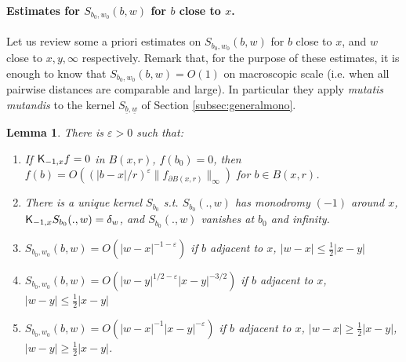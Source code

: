 \documentclass[10pt]{article}
\newcommand{\eps}{\varepsilon}
\newcommand{\rK}{{\sf K}}
\newtheorem{Lem}[thm]{Lemma}
\begin{document}
\paragraph{Estimates for $S_{b_0,w_0}(b,w)$ for $b$ close to $x$.\\}

Let us review some a priori estimates on $S_{b_0,w_0}(b,w)$ for $b$ close to $x$, and $w$ close to $x,y,\infty$ respectively. 
%
Remark that, for the purpose of these estimates, it is enough to know that $S_{b_0,w_0}(b,w)=O(1)$ on macroscopic scale (i.e. when all pairwise distances are comparable and large). In particular they apply {\em mutatis mutandis} to the kernel $S_{\underline b,\underline w}$ of Section \ref{subsec:generalmono}.

\begin{Lem}\label{Lem:magn_apriori}
There is $\eps>0$ such that:
\begin{enumerate} 
\item If $\rK_{-1,x} f=0$ in $B(x,r)$, $f(b_0)=0$, then $f(b)=O((|b-x|/r)^\eps\|f_{\partial B(x,r)}\|_\infty)$ for $b\in B(x,r)$.
\item There is a unique kernel $S_{b_0}$ s.t. $S_{b_0}(.,w)$ has monodromy $(-1)$ around $x$, $\rK_{-1,x} S_{b_0}(.,w)=\delta_w$, and $S_{b_0}(.,w)$ vanishes at $b_0$ and infinity.
\item $S_{b_0,w_0}(b,w)=O(|w-x|^{-1-\eps})$ if $b$ adjacent to $x$, $|w-x|\leq\frac 12|x-y|$
\item $S_{b_0,w_0}(b,w)=O(|w-y|^{1/2-\eps}|x-y|^{-3/2})$ if $b$ adjacent to $x$, $|w-y|\leq\frac 12|x-y|$
\item $S_{b_0,w_0}(b,w)=O(|w-x|^{-1}|x-y|^{-\eps})$ if $b$ adjacent to $x$, $|w-x|\geq\frac 12|x-y|$,$|w-y|\geq\frac 12|x-y|$.
\end{enumerate}
\end{Lem}
\end{document}

